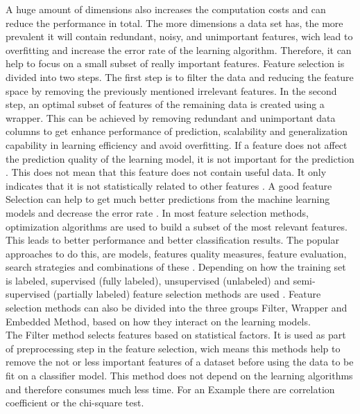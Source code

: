 \documentclass[../masterarbeit.tex]{subfiles}
\begin{document}
A huge amount of dimensions also increases the computation costs and can reduce the performance in total. The more dimensions a data set has, the more prevalent it will contain redundant, noisy, and unimportant features, wich lead to overfitting and increase the error rate of the learning algorithm. Therefore, it can help to focus on a small subset of really important features. \autocite[]{CAI201870} \textcite[]{ALLAM2022329} \textcite[]{VenkateshAnuradha:2019} 
Feature selection is divided into two steps. The first step is to filter the data and reducing the feature space by removing the previously mentioned irrelevant features. In the second step, an optimal subset of features of the remaining data is created using a wrapper. \autocite[]{CAI201870}
This can be achieved by removing redundant and unimportant data columns to get enhance performance of prediction,  scalability  and  generalization  capability in learning efficiency and avoid overfitting. If a feature does not affect the prediction quality of the learning model, it is not important for the prediction \textcite[]{VenkateshAnuradha:2019}. This does not mean that this feature does not contain useful data. It only indicates that it is not statistically related to other features \textcite[]{VenkateshAnuradha:2019}.
 A good feature Selection can help to get much better predictions from the machine learning models and decrease the error rate \textcite[]{CAI201870}. 
In most feature selection methods, optimization algorithms are used to build a subset of the most relevant features. This leads to better performance and better classification results. \autocite[]{ALLAM2022329}
The popular approaches to do this, are models, features quality measures, feature evaluation, search strategies and combinations of these \textcite[]{VenkateshAnuradha:2019}.
Depending on how the training set is labeled, supervised (fully labeled), unsupervised (unlabeled) and semi-supervised (partially labeled) feature selection methods are used \textcite[]{CAI201870}.
Feature selection methods can also be divided into the three groups Filter, Wrapper and Embedded Method, based on how they interact on the learning models. \\
 The Filter method selects features based on statistical factors. It is used as part of preprocessing step in the feature selection, wich means this methods help to remove the not or less important features of a dataset before using the data to be fit on a classifier model. This method does not depend on the learning algorithms and therefore consumes much less time. For an Example there are correlation  coefficient or the chi-square test. \autocite[]{VenkateshAnuradha:2019} \textcite[]{CAI201870} \textcite[]{PISNER2020101} \\~\\
\end{document}
